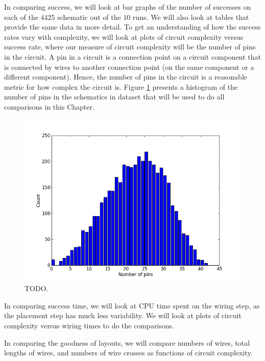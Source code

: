 In comparing success, we will look at bar graphs of the number of successes on
each of the $4425$ schematic out of the $10$ runs. We will also look at tables
that provide the same data in more detail. To get an understanding of how the
success rates vary with complexity, we will look at plots of circuit complexity
versus success rate, where our measure of circuit complexity will be the number
of pins in the circuit. A pin in a circuit is a connection point on a circuit
component that is connected by wires to another connection point (on the same
component or a different component). Hence, the number of pins in the circuit is
a reasonable metric for how complex the circuit is. Figure
\ref{fig:complexity_hist} presents a histogram of the number of pins in the
schematics in dataset that will be used to do all comparisons in this Chapter.

\begin{figure}[H]
\begin{center}
\includegraphics[width=\textwidth]{Images/complexity_hist.png}
\caption{TODO.}
\label{fig:complexity_hist}
\end{center}
\end{figure}

In comparing success time, we will look at CPU time spent on the wiring step, as
the placement step has much less variability. We will look at plots of circuit
complexity versus wiring times to do the comparisons.

In comparing the goodness of layouts, we will compare numbers of wires, total
lengths of wires, and numbers of wire crosses as functions of circuit complexity.

